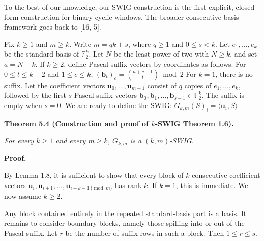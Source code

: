 To the best of our knowledge, our SWIG construction is the first explicit, closed-form construction for binary cyclic windows. The broader consecutive-basis framework goes back to [16, 5].\par




Fix $k\geq 1$ and $m\geq k$. Write $m=qk+s$, where $q\geq 1$ and $0\leq s<k$. Let $e_{1},\ldots,e_{k}$ be the standard basis of $\mathbb{F}_{2}^{k}$. Let $N$ be the least power of two with $N\geq k$, and set $a=N-k$. If $k\geq 2$, define Pascal suffix vectors by coordinates as follows. For $0\leq t\leq k-2$ and $1\leq c\leq k$,
$(\mathbf{b}_{t})_{c}=\binom{a+c-1}{t}\bmod 2$
For $k=1$, there is no suffix. Let the coefficient vectors $\mathbf{u}_{0},\ldots,\mathbf{u}_{m-1}$ consist of $q$ copies of $e_{1},\ldots,e_{k}$, followed by the first $s$ Pascal suffix vectors ${\mathbf{b}_{0}},{\mathbf{b}_{1}},\ldots,{\mathbf{b}_{s-1}}\in\mathbb{F}^{k}_{2}$. The suffix is empty when $s=0$. We are ready to define the SWIG:
$G_{k,m}(S)_{i}=\langle\mathbf{u}_{i},S\rangle$\par





\par\medskip\noindent\textbf{
\textbf{Theorem 5.4}\textbf{ }(Construction and proof of $k$-SWIG Theorem 1.6)\textbf{.}
}\par



\emph{For every $k\geq 1$ and every $m\geq k$, $G_{k,m}$ is a
$(k,m)$-SWIG.}\par






\par\medskip\noindent\textbf{Proof.}\par




By Lemma 1.8, it is sufficient to show that every
block of $k$ consecutive coefficient vectors
${\mathbf{u}_{i}},{\mathbf{u}_{i+1}},\ldots,{\mathbf{u}_{i+k-1\pmod{m}}}$
has rank $k$. If $k=1$, this is immediate.
We now assume $k\geq 2$.\par




Any block contained entirely in the repeated standard-basis part is a basis.
It remains to consider boundary blocks, namely those spilling into or out of the Pascal suffix.
Let $r$ be the number of suffix rows in such a block. Then $1\leq r\leq s$.\par




